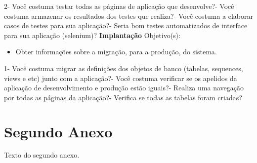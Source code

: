 \begin{anexosenv}
    2- Você costuma testar todas as páginas de aplicação que desenvolve?- Você costuma armazenar os resultados dos testes que realiza?- Você costuma a elaborar casos de testes para sua aplicação?- Seria bom testes automatizados de interface para sua aplicação (selenium)?\newline
\newline
\textbf{Implantação}\newline\newline
Objetivo(s):
\begin{itemize}
\item Obter informações sobre a migração, para a produção, do sistema.
\end{itemize}
    1- Você costuma migrar as definições dos objetos de banco (tabelas, sequences, views e etc) junto com a aplicação?- Você costuma verificar se os apelidos da aplicação de desenvolvimento e produção estão iguais?- Realiza uma navegação por todas as páginas da aplicação?- Verifica se todas as tabelas foram criadas?\newline
\newline
\chapter{Segundo Anexo}

Texto do segundo anexo.

\end{anexosenv}

